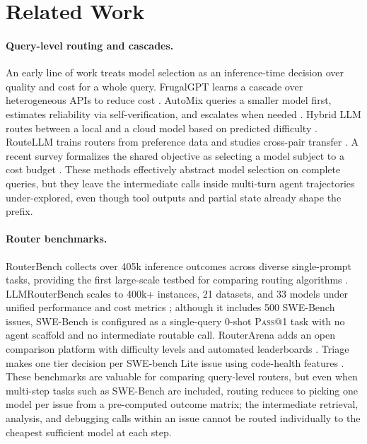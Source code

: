 \section{Related Work}
\label{sec:related}

\paragraph{Query-level routing and cascades.}
An early line of work treats model selection as an inference-time decision over
quality and cost for a whole query. FrugalGPT learns a cascade over heterogeneous APIs
to reduce cost \citep{chen2024frugalgpt}. AutoMix queries a smaller model
first, estimates reliability via self-verification, and escalates when needed
\citep{aggarwal2023automix}. Hybrid LLM routes between a local and a cloud
model based on predicted difficulty \citep{ding2024hybrid}. RouteLLM trains
routers from preference data and studies cross-pair transfer
\citep{ong2024routellm}. A recent survey formalizes the shared objective as
selecting a model subject to a cost budget \citep{varangotreille2025doing}.
These methods effectively abstract model selection on complete queries, but
they leave the intermediate calls inside multi-turn agent trajectories
under-explored, even though tool outputs and partial state already shape the
prefix.

\paragraph{Router benchmarks.}
RouterBench collects over 405k inference outcomes across diverse single-prompt
tasks, providing the first large-scale testbed for comparing routing algorithms
\citep{hu2024routerbench}. LLMRouterBench scales to 400k+ instances,
21 datasets, and 33 models under unified performance and cost metrics
\citep{li2026llmrouterbench}; although it includes 500 SWE-Bench issues,
SWE-Bench is configured as a single-query $0$-shot \textsc{Pass@1} task with
no agent scaffold and no intermediate routable call. RouterArena adds an open
comparison platform with difficulty levels and automated leaderboards
\citep{lu2025routerarena}. Triage makes one tier decision per SWE-bench Lite
issue using code-health features \citep{madeyski2026triage}. These benchmarks are valuable for comparing query-level routers, but even
when multi-step tasks such as SWE-Bench are included, routing reduces to
picking one model per issue from a pre-computed outcome matrix; the
intermediate retrieval, analysis, and debugging calls within an issue cannot
be routed individually to the cheapest sufficient model at each step.

